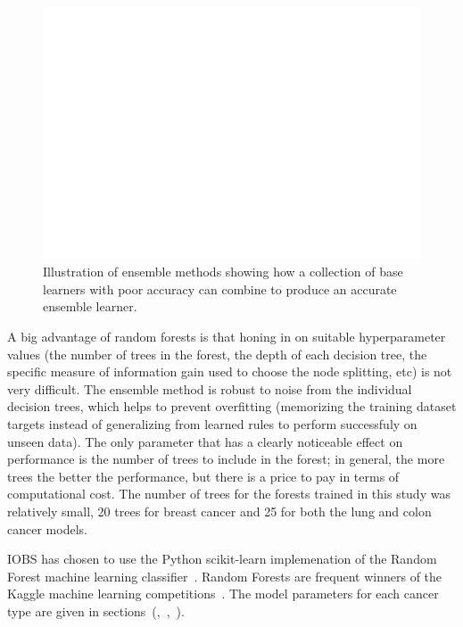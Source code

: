 \documentclass[10pt,letterpaper]{article}
\begin{document}
\begin{figure}[!ht]
  \centering
    \includegraphics[scale=.75]{ensemble}
\caption{\label{fig:ensemble} Illustration of ensemble methods showing how a collection of base learners with poor accuracy can combine to produce an accurate ensemble learner.}
\end{figure}


A big advantage of random forests is that honing in on suitable hyperparameter values (the number of trees in the forest, the depth of each decision tree, the specific measure of information gain used to choose the node splitting, etc) is not very difficult. The ensemble method is robust to noise from the individual decision trees, which helps to prevent overfitting (memorizing the training dataset targets instead of generalizing from learned rules to perform successfuly on unseen data). The only parameter that has a clearly noticeable effect on performance is the number of trees to include in the forest; in general, the more trees the better the performance, but there is a price to pay in terms of computational cost. The number of trees for the forests trained in this study was relatively small, 20 trees for breast cancer and 25 for both the lung and colon cancer models. 

IOBS has chosen to use the Python scikit-learn implemenation of the Random Forest machine 
learning classifier~\cite{rf}.
Random Forests are frequent winners of the Kaggle machine learning competitions~\cite{kagglerf}.
The model parameters for each cancer type are given in sections~(,~,~).
\end{document}
